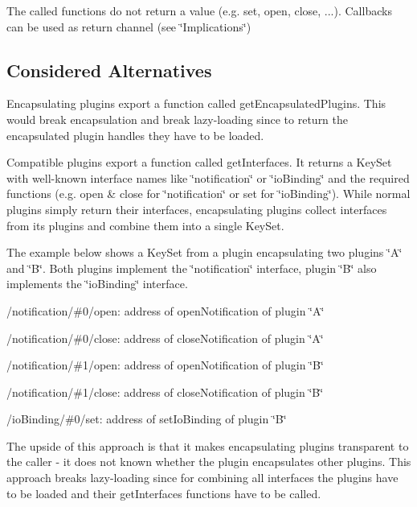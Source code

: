 \begin{DoxyEnumerate}
\item The called functions do not return a value (e.\+g. {\ttfamily set}, {\ttfamily open}, {\ttfamily close}, ...). Callbacks can be used as return channel (see \char`\"{}\+Implications\char`\"{})
\end{DoxyEnumerate}

\subsection*{Considered Alternatives}


\begin{DoxyItemize}
\item Encapsulating plugins export a function called {\ttfamily get\+Encapsulated\+Plugins}. This would break encapsulation and break lazy-\/loading since to return the encapsulated plugin handles they have to be loaded.
\item Compatible plugins export a function called {\ttfamily get\+Interfaces}. It returns a Key\+Set with well-\/known interface names like \char`\"{}notification\char`\"{} or \char`\"{}io\+Binding\char`\"{} and the required functions (e.\+g. {\ttfamily open} \& {\ttfamily close} for \char`\"{}notification\char`\"{} or {\ttfamily set} for \char`\"{}io\+Binding\char`\"{}). While normal plugins simply return their interfaces, encapsulating plugins collect interfaces from its plugins and combine them into a single Key\+Set.

The example below shows a Key\+Set from a plugin encapsulating two plugins \char`\"{}\+A\char`\"{} and \char`\"{}\+B\char`\"{}. Both plugins implement the \char`\"{}notification\char`\"{} interface, plugin \char`\"{}\+B\char`\"{} also implements the \char`\"{}io\+Binding\char`\"{} interface.
\begin{DoxyItemize}
\item {\ttfamily /notification/\#0/open}\+: address of {\ttfamily open\+Notification} of plugin \char`\"{}\+A\char`\"{}
\item {\ttfamily /notification/\#0/close}\+: address of {\ttfamily close\+Notification} of plugin \char`\"{}\+A\char`\"{}
\item {\ttfamily /notification/\#1/open}\+: address of {\ttfamily open\+Notification} of plugin \char`\"{}\+B\char`\"{}
\item {\ttfamily /notification/\#1/close}\+: address of {\ttfamily close\+Notification} of plugin \char`\"{}\+B\char`\"{}
\item {\ttfamily /io\+Binding/\#0/set}\+: address of {\ttfamily set\+Io\+Binding} of plugin \char`\"{}\+B\char`\"{}
\end{DoxyItemize}

The upside of this approach is that it makes encapsulating plugins transparent to the caller -\/ it does not known whether the plugin encapsulates other plugins. This approach breaks lazy-\/loading since for combining all interfaces the plugins have to be loaded and their {\ttfamily get\+Interfaces} functions have to be called.
\end{DoxyItemize}

